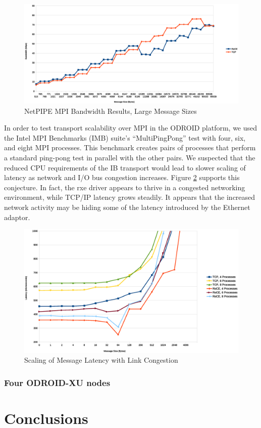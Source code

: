 \documentclass[a4paper]{article}
\begin{document}
\begin{figure}[H]
\includegraphics[width=\textwidth]{netpipe_bw_large}
\caption{NetPIPE MPI Bandwidth Results, Large Message Sizes}
\label{npmpi-hbw}
\end{figure}

In order to test transport scalability over MPI in the ODROID platform, we used
the Intel MPI Benchmarks (IMB) suite's ``MultiPingPong'' test with four, six,
and eight MPI processes. This benchmark creates pairs of processes that perform
a standard ping-pong test in parallel with the other pairs. We suspected that
the reduced CPU requirements of the IB transport would lead to slower scaling of
latency as network and I/O bus congestion increases. Figure \ref{multipingpong}
supports this conjecture. In fact, the rxe driver appears to thrive in a
congested networking environment, while TCP/IP latency grows steadily. It
appears that the increased network activity may be hiding some of the latency
introduced by the Ethernet adaptor. %

\begin{figure}[H]
\includegraphics[width=\textwidth]{pingpong_multi_zoom}
\caption{Scaling of Message Latency with Link Congestion}
\label{multipingpong}
\end{figure}

\subsubsection{\textbf{Four ODROID-XU nodes}}

\newpage
\section{\textbf{Conclusions}}
\label{conclusions}



\end{document}
